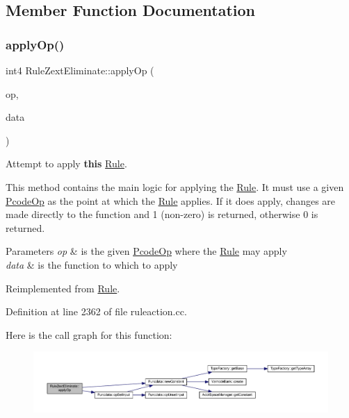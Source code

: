 \subsection{Member Function Documentation}
\mbox{\label{class_rule_zext_eliminate_a06205a6c85cac93cf2ef1de9e8fc93ff}} 
\subsubsection{\texorpdfstring{applyOp()}{applyOp()}}
{\footnotesize\ttfamily int4 Rule\+Zext\+Eliminate\+::apply\+Op (\begin{DoxyParamCaption}\item[{\mbox{\hyperlink{class_pcode_op}{Pcode\+Op}} $\ast$}]{op,  }\item[{\mbox{\hyperlink{class_funcdata}{Funcdata}} \&}]{data }\end{DoxyParamCaption})\hspace{0.3cm}{\ttfamily [virtual]}}



Attempt to apply {\bfseries{this}} \mbox{\hyperlink{class_rule}{Rule}}. 

This method contains the main logic for applying the \mbox{\hyperlink{class_rule}{Rule}}. It must use a given \mbox{\hyperlink{class_pcode_op}{Pcode\+Op}} as the point at which the \mbox{\hyperlink{class_rule}{Rule}} applies. If it does apply, changes are made directly to the function and 1 (non-\/zero) is returned, otherwise 0 is returned. 
\begin{DoxyParams}{Parameters}
{\em op} & is the given \mbox{\hyperlink{class_pcode_op}{Pcode\+Op}} where the \mbox{\hyperlink{class_rule}{Rule}} may apply \\
\hline
{\em data} & is the function to which to apply \\
\hline
\end{DoxyParams}


Reimplemented from \mbox{\hyperlink{class_rule_a4e3e61f066670175009f60fb9dc60848}{Rule}}.



Definition at line 2362 of file ruleaction.\+cc.

Here is the call graph for this function\+:
\nopagebreak
\begin{figure}[H]
\begin{center}
\leavevmode
\includegraphics[width=350pt]{class_rule_zext_eliminate_a06205a6c85cac93cf2ef1de9e8fc93ff_cgraph}
\end{center}
\end{figure}
\mbox{\label{class_rule_zext_eliminate_aa695ebff0d43a28e791e03bbfaf792b7}} 
